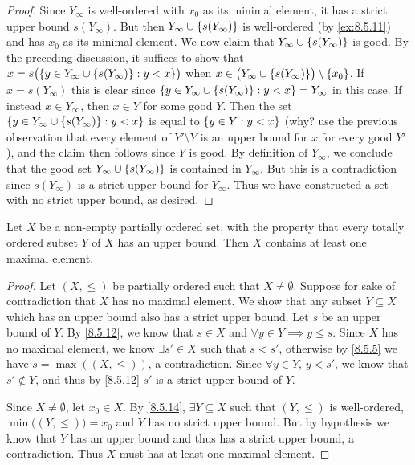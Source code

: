 \begin{proof}
  Since \(Y_{\infty}\) is well-ordered with \(x_0\) as its minimal element, it has a strict upper bound \(s(Y_{\infty})\).
  But then \(Y_{\infty} \cup \left\lbrace s(Y_{\infty})\right\rbrace\) is well-ordered (by \cref{ex:8.5.11}) and has \(x_0\) as its minimal element.
  We now claim that \(Y_{\infty} \cup \left\lbrace s(Y_{\infty})\right\rbrace\) is good.
  By the preceding discussion, it suffices to show that \(x = s\big(\set{y \in Y_{\infty} \cup \set{s(Y_{\infty})} : y < x}\big)\) when \(x \in \big(Y_{\infty} \cup \set{s(Y_{\infty})}\big) \setminus \set{x_0}\).
  If \(x = s(Y_{\infty})\) this is clear since \(\left\lbrace y \in Y_{\infty} \cup \left\lbrace s(Y_{\infty})\right\rbrace : y < x\right\rbrace = Y_{\infty}\) in this case.
  If instead \(x \in Y_{\infty}\), then \(x \in Y\) for some good \(Y\).
  Then the set \(\left\lbrace y \in Y_{\infty} \cup \left\lbrace s(Y_{\infty})\right\rbrace: y < x\right\rbrace\) is equal to \(\left\lbrace y \in Y : y < x\right\rbrace\)
  (why? use the previous observation that every element of \(Y' \setminus Y\) is an upper bound for \(x\) for every good \(Y'\)), and the claim then follows since \(Y\) is good.
  By definition of \(Y_{\infty}\), we conclude that the good set \(Y_{\infty} \cup \left\lbrace s(Y_{\infty})\right\rbrace\) is contained in \(Y_{\infty}\).
  But this is a contradiction since \(s(Y_{\infty})\) is a strict upper bound for \(Y_{\infty}\).
  Thus we have constructed a set with no strict upper bound, as desired.
\end{proof}

\begin{lem}\label{8.5.15}
  Let \(X\) be a non-empty partially ordered set, with the property that every totally ordered subset \(Y\) of \(X\) has an upper bound.
  Then \(X\) contains at least one maximal element.
\end{lem}

\begin{proof}
  Let \((X, \leq)\) be partially ordered such that \(X \neq \emptyset\).
  Suppose for sake of contradiction that \(X\) has no maximal element.
  We show that any subset \(Y \subseteq X\) which has an upper bound also has a strict upper bound.
  Let \(s\) be an upper bound of \(Y\).
  By \cref{8.5.12}, we know that \(s \in X\) and \(\forall y \in Y \implies y \leq s\).
  Since \(X\) has no maximal element, we know \(\exists s' \in X\) such that \(s < s'\), otherwise by \cref{8.5.5} we have \(s = \max((X, \leq))\), a contradiction.
  Since \(\forall y \in Y\), \(y < s'\), we know that \(s' \notin Y\), and thus by \cref{8.5.12} \(s'\) is a strict upper bound of \(Y\).

  Since \(X \neq \emptyset\), let \(x_0 \in X\).
  By \cref{8.5.14}, \(\exists Y \subseteq X\) such that \((Y, \leq)\) is well-ordered, \(\min\big((Y, \leq)\big) = x_0\) and \(Y\) has no strict upper bound.
  But by hypothesis we know that \(Y\) has an upper bound and thus has a strict upper bound, a contradiction.
  Thus \(X\) must has at least one maximal element.
\end{proof}

